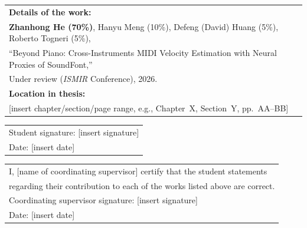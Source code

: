 \vskip 0.5cm
	
\begin{tabular}{@{}p{\dimexpr\textwidth-2\tabcolsep\relax}@{}}
\textbf{Details of the work:} \\
\textbf{Zhanhong He (70\%)}, Hanyu Meng (10\%), Defeng (David) Huang (5\%), Roberto Togneri (5\%),\\
``Beyond Piano: Cross-Instruments MIDI Velocity Estimation with Neural Proxies of SoundFont,''\\
Under review (\emph{ISMIR} Conference), 2026.\\
\textbf{Location in thesis:} \\
{[insert chapter/section/page range, e.g., Chapter~X, Section~Y, pp.~AA--BB]}\\%
\end{tabular} 
	
\vskip 0.5cm
	
\begin{tabular}{@{}p{\dimexpr\textwidth-2\tabcolsep\relax}@{}}
Student signature: [insert signature] \\
Date: [insert date]\\
\end{tabular}
	
\vskip 0.5cm
	
\begin{tabular}{@{}p{\dimexpr\textwidth-2\tabcolsep\relax}@{}}
I, [name of coordinating supervisor] certify that the student statements \\
regarding their contribution to each of the works listed above are correct. \\
Coordinating supervisor signature: [insert signature]\\
Date: [insert date]
\end{tabular}
